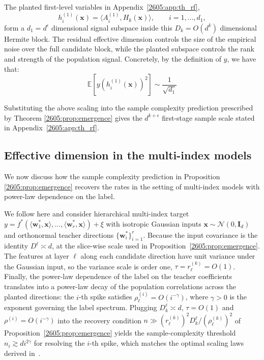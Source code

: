The planted first-level variables in Appendix~\ref{2605:app:th_rf},
\[
    h_i^{(1)}(\bm x)
    =
    \langle A_i^{(1)},H_k(\bm x)\rangle,
    \qquad i=1,\ldots,d_1,
\]
form a \(d_1=d^\epsilon\) dimensional signal subspace inside this
\(D_k=O(d^k)\) dimensional Hermite block. The residual effective dimension
controls the size of the empirical noise over the full candidate block, while
the planted subspace controls the rank and strength of the population signal.
Concretely, by the definition of $y$, we have that:
\begin{equation}
     \mathbb{E}[y(h_i^{(1)}(\bm x))^2] \sim \frac{1}{\sqrt{d_1}}
\end{equation}


Substituting the above scaling into the sample complexity prediction prescribed by Theorem \ref{2605:prop:emergence} gives the
\(d^{k+\epsilon}\) first-stage sample scale stated in
Appendix~\ref{2605:app:th_rf}.



\subsection{Effective dimension in the multi-index models}


We now discuss how the sample complexity prediction in Proposition \ref{2605:prop:emergence} recovers the rates in the setting of multi-index models with power-law dependence on the label. 

We follow here \cite{defilippis2026scaling,defilippis2026optimal} and consider hierarchical multi-index target \(y = f^*(\langle\bm{w}_1^*,\bm{x}\rangle,\dots,\langle\bm{w}_r^*,\bm{x}\rangle) + \xi\) with isotropic Gaussian inputs \(\bm{x}\sim\mathcal{N}(0,\bm{I}_d)\) and orthonormal teacher directions \(\{\bm{w}_i^*\}_{i=1}^r\). Because the input covariance is the identity \(D^\ell \asymp d\), at the slice-wise scale used in Proposition~\ref{2605:prop:emergence}. The features at layer \(\ell\) along each candidate direction have unit variance under the Gaussian input, so the variance scale is order one, \(\tau = r_\ell^{(k)} = O(1)\). Finally, the power-law dependence of the label on the teacher coefficients translates into a power-law decay of the population correlations across the planted directions: the \(i\)-th spike satisfies \(\rho_\ell^{(i)} = O(i^{-\gamma})\), where \(\gamma>0\) is the exponent governing the label spectrum. Plugging \(D_k^\ell \asymp d\), \(\tau = O(1)\) and \(\rho^{(i)} = O(i^{-\gamma})\) into the recovery condition \(n \gg (r_\ell^{(k)})^2 D_k^\ell / (\rho_\ell^{(k)})^2\) of Proposition~\ref{2605:prop:emergence} yields the sample-complexity threshold \(n_i \gtrsim d  i^{2\gamma}\) for resolving the \(i\)-th spike, which matches the optimal scaling laws derived in~\cite{defilippis2026scaling,defilippis2026optimal}.
